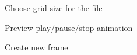 \documentclass[12pt]{article} %
\begin{document}
\begin{figure}[H]
	\centering
	\caption{Choose grid size for the file}
	\label{fig:UC7}
\end{figure}

\begin{figure}[H]
	\centering
	\caption{Preview play/pause/stop animation}
	\label{fig:UC8}
\end{figure}

\begin{figure}[H]
	\centering
	\caption{Create new frame}
	\label{fig:UC9}
\end{figure}
\end{document}
